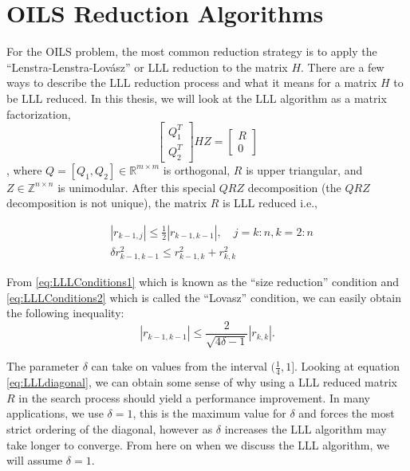 \documentclass[12pt,Bold,letterpaper]{mcgilletdclass}
\newcommand{\vsp}{\vspace{\baselineskip}}
\begin{document}
\vsp \section{OILS Reduction Algorithms} \label{sec:oilsreduction}
For the OILS problem, the most common reduction strategy is to apply the ``Lenstra-Lenstra-Lovász'' or LLL reduction \cite{LenLL82} to the matrix $H$. There are a few ways to describe the LLL reduction process and what it means for a matrix $H$ to be LLL reduced. In this thesis, we will look at the LLL algorithm as a matrix factorization, 
$$\begin{bmatrix}
Q_1^T\\ 
Q_2^T
\end{bmatrix}
HZ = 
\begin{bmatrix}
R\\ 
0
\end{bmatrix}$$,
where $Q = [Q_1, Q_2] \in \mathbb{R}^{m \times m} $ is orthogonal, $R$ is upper triangular, and $Z \in \mathbb{Z}^{n \times n}$ is unimodular. After this special $QRZ$ decomposition (the $QRZ$ decomposition is not unique), the matrix $R$ is LLL reduced i.e.,

\begin{align} \label{eq:LLLConditions1}
&\left | r_{k-1,j} \right | \le \frac{1}{2} \left | r_{k-1,k-1} \right |, \quad
j = k:n, k=2:n \\
\label{eq:LLLConditions2}
&\delta r_{k-1,k-1}^2 \le r_{k-1,k}^2 + r_{k,k}^2
\end{align}

From \eqref{eq:LLLConditions1} which is known as the ``size reduction''
condition and \eqref{eq:LLLConditions2} which is called the ``Lovasz''
condition, we can easily obtain the following inequality:
\begin{equation} \label{eq:LLLdiagonal}
\left | r_{k-1,k-1} \right | \le \frac{2}{\sqrt{4\delta -1}}\left | r_{k,k} \right |.
\end{equation}

The parameter $\delta$ can take on values from the interval $(\frac{1}{4}, 1]$. Looking at
equation \eqref{eq:LLLdiagonal}, we can obtain some sense of why using a LLL reduced
matrix $R$ in the search process should yield a performance improvement. In many
applications, we use $\delta=1$, this is the maximum value for $\delta$ and
forces the most strict ordering of the diagonal, however as $\delta$ increases the LLL algorithm may take longer to converge. From here on when we discuss the LLL algorithm, we will assume $\delta = 1$.
\end{document}
